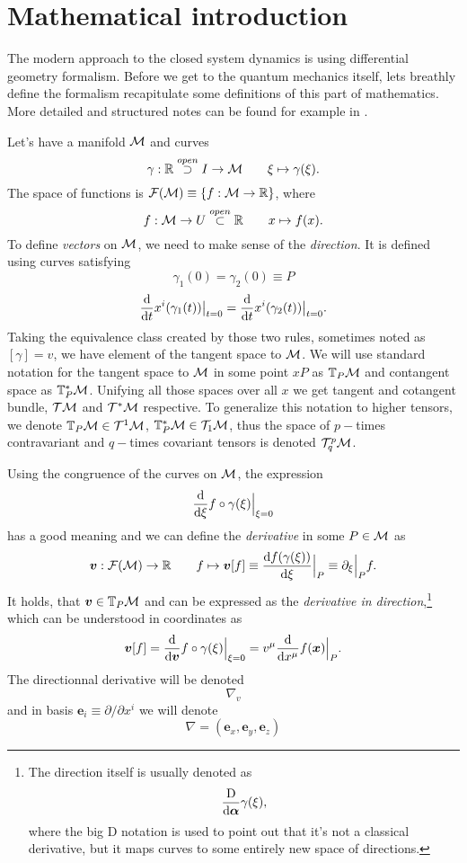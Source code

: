 \chapter{Mathematical introduction}
The modern approach to the closed system dynamics is using differential geometry formalism. Before we get to the quantum mechanics itself, lets breathly define the formalism recapitulate some definitions of this part of mathematics. More detailed and structured notes can be found for example in \citep{fecko}.

Let's have a manifold $\mathcal{M}$ and curves 
$$\gamma:\mathbb{R} \overset{open}{\supset} I \rightarrow \mathcal{M} \qquad \xi\mapsto \gamma(\xi).$$ 
The space of functions is $\mathcal{F}(\mathcal{M})\equiv\{f:\mathcal{M}\rightarrow \mathbb{R}\}$, where 
$$f:\mathcal{M}\rightarrow U\overset{open}{\subset} \mathbb{R} \qquad x\mapsto f(x).$$
To define \emph{vectors} on $\mathcal{M}$, we need to make sense of the \emph{direction}. It is defined using curves satisfying 
$$\gamma_1(0)=\gamma_2(0)\equiv P$$
$$\frac{\mathrm{d} }{\mathrm{d} t}x^i(\gamma_1(t))\big|_{t=0}=\frac{\mathrm{d} }{\mathrm{d} t}x^i(\gamma_2(t))\big|_{t=0}.$$
Taking the equivalence class created by those two rules, sometimes noted as $[\gamma]=v$, we have element of the tangent space to $\mathcal{M}$. We will use standard notation for the tangent space to $\mathcal{M}$ in some point $xP$ as $\mathbb{T}_P\mathcal{M}$ and contangent space as $\mathbb{T}^*_P\mathcal{M}$. Unifying all those spaces over all $x$ we get tangent and cotangent bundle, $\mathcal{T}\mathcal{M}$ and $\mathcal{T}^*\mathcal{M}$ respective. To generalize this notation to higher tensors, we denote $\mathbb{T}_P\mathcal{M}\in \mathcal{T}^1\mathcal{M}$, $\mathbb{T}^*_P\mathcal{M}\in \mathcal{T}_1\mathcal{M}$, thus the space of $p-$times contravariant and $q-$times covariant tensors is denoted $\mathcal{T}^p_q\mathcal{M}$.

Using the congruence of the curves on $\mathcal{M}$, the expression 
\begin{equation}
    \frac{\mathrm{d} }{\mathrm{d} \xi}f\circ \gamma(\xi)\Big|_{\xi=0}
\end{equation}
has a good meaning and we can define the \emph{derivative} in some $P\in\mathcal{M}$ as
\begin{equation}
    \bm v: \mathcal{F}(\mathcal{M})\rightarrow \mathbb{R} \qquad f\mapsto \bm v[f]\equiv \frac{\mathrm{d} f(\gamma(\xi))}{\mathrm{d} \xi}\Big|_P \equiv \partial_\xi\Big|_P f .
\end{equation}
It holds, that $\bm v\in \mathbb{T}_P\mathcal{M}$ and can be expressed as the \emph{derivative in direction},\footnote{
        The direction itself is usually denoted as
        \begin{equation}
            \frac{\mathrm{D}}{\mathrm{d}\bm\alpha}\gamma(\xi),
        \end{equation}
        where the big D notation is used to point out that it's not a classical derivative, but it maps curves to some entirely new space of directions.
    } 
which can be understood in coordinates as
\begin{equation}
    \bm v[f] = \frac{\mathrm{d} }{\mathrm{d} \bm v} f\circ \gamma(\xi)\Big|_{\xi=0}=v^\mu\frac{\mathrm{d} }{\mathrm{d} x^\mu} f(\bm x)\Big|_{P}.
\end{equation}
The directionnal derivative will be denoted 
$$\nabla_v$$
and in basis $\bm e_i \equiv \partial/\partial x^i$ we will denote 
$$\nabla=(\bm e_x, \bm e_y,\bm e_z)$$



